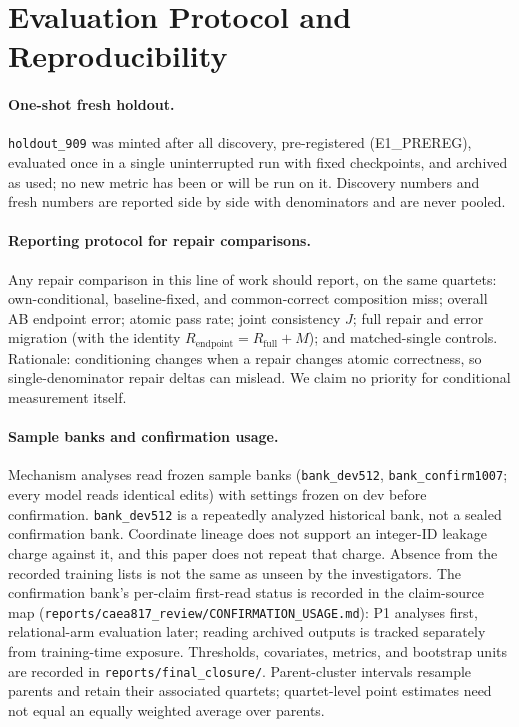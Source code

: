 \section{Evaluation Protocol and Reproducibility}
\label{sec:repro}

\paragraph{One-shot fresh holdout.} \texttt{holdout\_909} was minted after
all discovery, pre-registered (E1\_PREREG), evaluated once in a single
uninterrupted run with fixed checkpoints, and archived as used; no new
metric has been or will be run on it. Discovery numbers and fresh numbers
are reported side by side with denominators and are never pooled.

\paragraph{Reporting protocol for repair comparisons.} Any repair
comparison in this line of work should report, on the same quartets:
own-conditional, baseline-fixed, and common-correct composition miss;
overall AB endpoint error; atomic pass rate; joint consistency $J$; full
repair and error migration (with the identity
$R_{\mathrm{endpoint}} = R_{\mathrm{full}} + M$); and matched-single
controls. Rationale: conditioning changes when a repair changes atomic
correctness, so single-denominator repair deltas can mislead. We claim no
priority for conditional measurement itself.

\paragraph{Sample banks and confirmation usage.} Mechanism analyses read
frozen sample banks (\texttt{bank\_dev512}, \texttt{bank\_confirm1007};
every model reads identical edits) with settings frozen on dev before
confirmation. \texttt{bank\_dev512} is a repeatedly analyzed historical
bank, not a sealed confirmation bank. Coordinate lineage does not support
an integer-ID leakage charge against it, and this paper does not repeat
that charge. Absence from the recorded training lists is not the same as
unseen by the investigators. The confirmation bank's per-claim first-read status is
recorded in the claim-source map
(\texttt{reports/caea817\_review/CONFIRMATION\_USAGE.md}): P1 analyses
first, relational-arm evaluation later; reading archived outputs is
tracked separately from training-time exposure. Thresholds, covariates,
metrics, and bootstrap units are recorded in
\texttt{reports/final\_closure/}. Parent-cluster intervals resample parents
and retain their associated quartets; quartet-level point estimates need
not equal an equally weighted average over parents.

